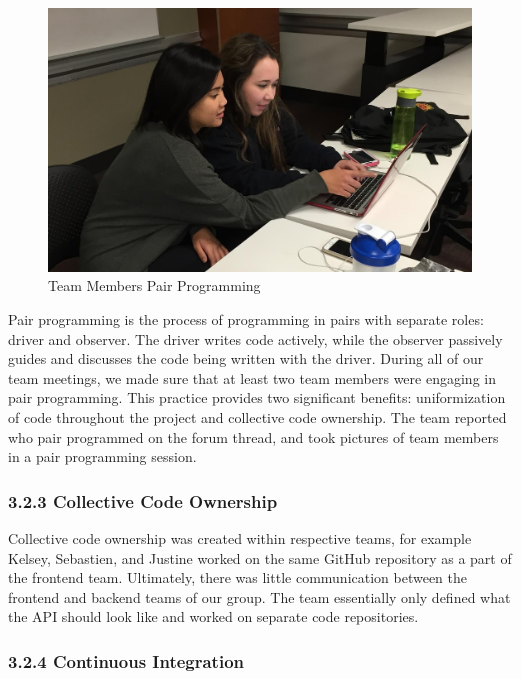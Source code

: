 \documentclass[]{article}
\begin{document}
\begin{figure}[htbp]
\centering
\includegraphics{serious_pair_prog.jpg}
\caption{Team Members Pair Programming}
\end{figure}

Pair programming is the process of programming in pairs with separate
roles: driver and observer. The driver writes code actively, while the
observer passively guides and discusses the code being written with the
driver. During all of our team meetings, we made sure that at least two
team members were engaging in pair programming. This practice provides
two significant benefits: uniformization of code throughout the project
and collective code ownership. The team reported who pair programmed on the forum thread, and took pictures of team members in a pair programming session.

\subsubsection{3.2.3 Collective Code
Ownership}\label{collective-code-ownership}

Collective code ownership was created within respective teams, for
example Kelsey, Sebastien, and Justine worked on the same GitHub
repository as a part of the frontend team. Ultimately, there was little
communication between the frontend and backend teams of our group. The
team essentially only defined what the API should look like and worked
on separate code repositories.

\subsubsection{3.2.4 Continuous
Integration}\label{continuous-integration}
\end{document}
